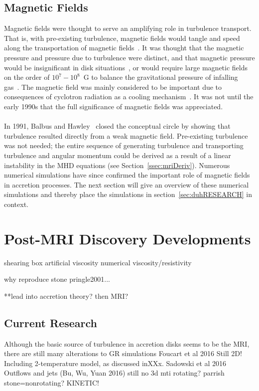 \subsection{Magnetic Fields}
Magnetic fields were thought to serve an amplifying role in turbulence transport. That is, with pre-existing turbulence, magnetic fields would tangle and speed along the transportation of magnetic fields~\cite{ShakuraSunyaev1973}. It was thought that the magnetic pressure and pressure due to turbulence were distinct, and that magnetic pressure would be insignificant in disk situations~\cite{LyndenBell1969}, or would require large magnetic fields on the order of $10^7-10^8$~G to balance the gravitational pressure of infalling gas~\cite{TrevesAl1988}. The magnetic field was mainly considered to be important due to consequences of cyclotron radiation as a cooling mechanism~\cite{Shapiro1973}. It was not until the early 1990s that the full significance of magnetic fields was appreciated.\\
\\
In 1991, Balbus and Hawley~\cite{BalbusHawley1991a,BalbusHawley1991b} closed the conceptual circle by showing that turbulence resulted directly from a weak magnetic field. Pre-existing turbulence was not needed; the entire sequence of generating turbulence and transporting turbulence and angular momentum could be derived as a result of a linear instability in the MHD equations (see Section~\ref{ssec:mriDeriv}). Numerous numerical simulations have since confirmed the important role of magnetic fields in accretion processes. The next section will give an overview of these numerical simulations and thereby place the simulations in section~\ref{sec:duhRESEARCH} in context. 

\section{Post-MRI Discovery Developments}

shearing box
artificial viscosity
numerical viscosity/resistivity


why reproduce stone pringle2001...



**lead into accretion theory? then MRI?

\subsection{Current Research}
Although the basic source of turbulence in accretion disks seems to be the MRI, there are still many alterations to
GR simulations Foucart et al 2016
Still 2D!
Including 2-temperature model, as discussed inXXx. Sadowski et al 2016
Outflows and jets (Bu, Wu, Yuan 2016)
still no 3d mti rotating? parrish  stone=nonrotating?
KINETIC!


